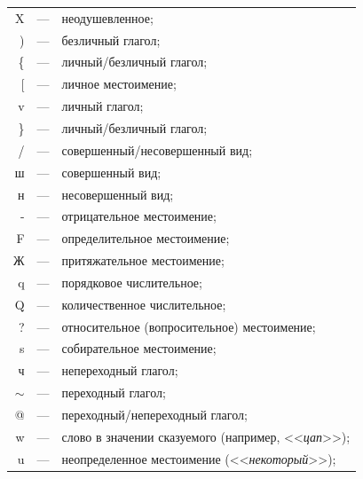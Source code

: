 \noindent

    \begin{tabular}{rcl}

        X&---& неодушевленное;\\

    )&---& безличный глагол;\\

    \{ &---& личный/безличный глагол;\\

    $[$&---& личное местоимение;\\

    v&---& личный глагол;\\

    \}&---& личный/безличный глагол;\\

    /&---& совершенный/несовершенный вид;\\

    ш&---& совершенный вид;\\

    н&---& несовершенный вид;\\

    -&---& отрицательное местоимение;\\

    F&---& определительное местоимение;\\

    Ж&---& притяжательное местоимение;\\

    q&---& порядковое числительное;\\

    Q&---& количественное числительное;\\

    ?&---& относительное (вопросительное) местоимение;\\

    s&---& собирательное местоимение;\\

    ч&---& непереходный глагол;\\

    $\sim$&---& переходный глагол;\\

    @&---& переходный/непереходный глагол;\\

    w&---& слово в значении сказуемого (например, <<\textit{цап}>>);\\

    u&---& неопределенное местоимение (<<\textit{некоторый}>>);\\


\end{tabular}
